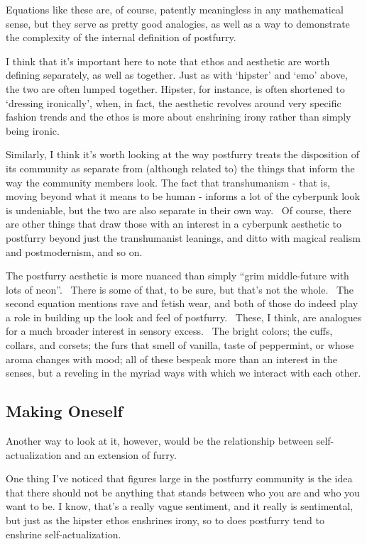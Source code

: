 Equations like these are, of course, patently meaningless in any
mathematical sense, but they serve as pretty good analogies, as well as
a way to demonstrate the complexity of the internal definition of
postfurry.

I think that it's important here to note that ethos and aesthetic are
worth defining separately, as well as together. Just as with `hipster'
and `emo' above, the two are often lumped together. Hipster, for
instance, is often shortened to `dressing ironically', when, in fact,
the aesthetic revolves around very specific fashion trends and the ethos
is more about enshrining irony rather than simply being ironic.

Similarly, I think it's worth looking at the way postfurry treats the
disposition of its community as separate from (although related to) the
things that inform the way the community members look. The fact that
transhumanism - that is, moving beyond what it means to be human -
informs a lot of the cyberpunk look is undeniable, but the two are also
separate in their own way.{~ Of course}, there are other things that
draw those with an interest in a cyberpunk aesthetic to postfurry beyond
just the transhumanist leanings, and ditto with magical realism and
postmodernism, and so on.

The postfurry aesthetic is more nuanced than simply ``grim middle-future
with lots of neon''. ~There is some of that, to be sure, but that's not
the whole. ~The second equation mentions rave and fetish wear, and both
of those do indeed play a role in building up the look and feel of
postfurry. ~These, I think, are analogues for a much broader interest in
sensory excess. ~The bright colors; the cuffs, collars, and corsets; the
furs that smell of vanilla, taste of peppermint, or whose aroma changes
with mood; all of these bespeak more than an interest in the senses, but
a reveling in the myriad ways with which we interact with each other.

\subsection{Making Oneself}\label{making-oneself}

Another way to look at it, however, would be the relationship between
self-actualization and an extension of furry.

One thing I've noticed that figures large in the postfurry community is
the idea that there should not be anything that stands between who you
are and who you want to be. I know, that's a really vague sentiment, and
it really is sentimental, but just as the hipster ethos enshrines irony,
so to does postfurry tend to enshrine self-actualization.

